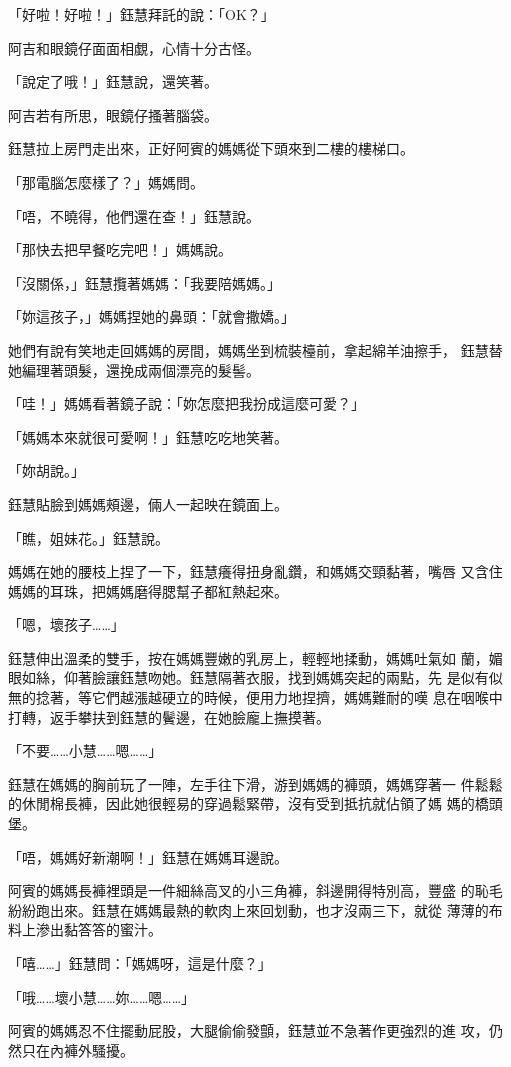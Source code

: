 「好啦！好啦！」鈺慧拜託的說：「OK？」

阿吉和眼鏡仔面面相覷，心情十分古怪。

「說定了哦！」鈺慧說，還笑著。

阿吉若有所思，眼鏡仔搔著腦袋。

鈺慧拉上房門走出來，正好阿賓的媽媽從下頭來到二樓的樓梯口。

「那電腦怎麼樣了？」媽媽問。

「唔，不曉得，他們還在查！」鈺慧說。

「那快去把早餐吃完吧！」媽媽說。

「沒關係，」鈺慧攬著媽媽：「我要陪媽媽。」

「妳這孩子，」媽媽捏她的鼻頭：「就會撒嬌。」

她們有說有笑地走回媽媽的房間，媽媽坐到梳裝檯前，拿起綿羊油擦手，
鈺慧替她編理著頭髮，還挽成兩個漂亮的髮髻。

「哇！」媽媽看著鏡子說：「妳怎麼把我扮成這麼可愛？」

「媽媽本來就很可愛啊！」鈺慧吃吃地笑著。

「妳胡說。」

鈺慧貼臉到媽媽頰邊，倆人一起映在鏡面上。

「瞧，姐妹花。」鈺慧說。

媽媽在她的腰枝上捏了一下，鈺慧癢得扭身亂鑽，和媽媽交頸黏著，嘴唇
又含住媽媽的耳珠，把媽媽磨得腮幫子都紅熱起來。

「嗯，壞孩子……」

鈺慧伸出溫柔的雙手，按在媽媽豐嫩的乳房上，輕輕地揉動，媽媽吐氣如
蘭，媚眼如絲，仰著臉讓鈺慧吻她。鈺慧隔著衣服，找到媽媽突起的兩點，先
是似有似無的捻著，等它們越漲越硬立的時候，便用力地捏擠，媽媽難耐的嘆
息在咽喉中打轉，返手攀扶到鈺慧的鬢邊，在她臉龐上撫摸著。

「不要……小慧……嗯……」

鈺慧在媽媽的胸前玩了一陣，左手往下滑，游到媽媽的褲頭，媽媽穿著一
件鬆鬆的休閒棉長褲，因此她很輕易的穿過鬆緊帶，沒有受到抵抗就佔領了媽
媽的橋頭堡。

「唔，媽媽好新潮啊！」鈺慧在媽媽耳邊說。

阿賓的媽媽長褲裡頭是一件細絲高叉的小三角褲，斜邊開得特別高，豐盛
的恥毛紛紛跑出來。鈺慧在媽媽最熱的軟肉上來回划動，也才沒兩三下，就從
薄薄的布料上滲出黏答答的蜜汁。

「嘻……」鈺慧問：「媽媽呀，這是什麼？」

「哦……壞小慧……妳……嗯……」

阿賓的媽媽忍不住擺動屁股，大腿偷偷發顫，鈺慧並不急著作更強烈的進
攻，仍然只在內褲外騷擾。

